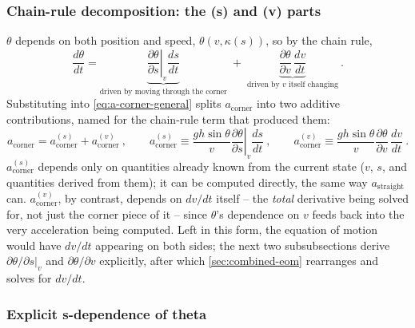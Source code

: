 \subsubsection{Chain-rule decomposition: the (s) and (v) parts}

$\theta$ depends on both position and speed, $\theta(v,\kappa(s))$, so by the
chain rule,
\begin{equation}
    \frac{d\theta}{dt} =
        \underbrace{\left.\frac{\partial\theta}{\partial s}\right|_v \frac{ds}{dt}}_{\text{driven by moving through the corner}}
        \;+\;
        \underbrace{\frac{\partial\theta}{\partial v}\,\frac{dv}{dt}}_{\text{driven by }v\text{ itself changing}}\ .
    \label{eq:dtheta-dt-chain-rule}
\end{equation}
Substituting into \cref{eq:a-corner-general} splits $a_{\mathrm{corner}}$ into
two additive contributions, named for the chain-rule term that produced them:
\begin{equation}
    a_{\mathrm{corner}} = a_{\mathrm{corner}}^{(s)} + a_{\mathrm{corner}}^{(v)}\ ,
    \qquad
    a_{\mathrm{corner}}^{(s)} \equiv
        \frac{gh\sin\theta}{v}\left.\frac{\partial\theta}{\partial s}\right|_v\frac{ds}{dt}\ ,
    \qquad
    a_{\mathrm{corner}}^{(v)} \equiv
        \frac{gh\sin\theta}{v}\frac{\partial\theta}{\partial v}\,\frac{dv}{dt}\ .
    \label{eq:a-corner-split}
\end{equation}
$a_{\mathrm{corner}}^{(s)}$ depends only on quantities already known from the
current state ($v$, $s$, and quantities derived from them); it can be computed
directly, the same way $a_{\mathrm{straight}}$ can. $a_{\mathrm{corner}}^{(v)}$,
by contrast, depends on $dv/dt$ itself -- the \emph{total} derivative being
solved for, not just the corner piece of it -- since $\theta$'s dependence on
$v$ feeds back into the very acceleration being computed. Left in this form,
the equation of motion would have $dv/dt$ appearing on both sides; the next
two subsubsections derive $\partial\theta/\partial s|_v$ and
$\partial\theta/\partial v$ explicitly, after which
\cref{sec:combined-eom} rearranges and solves for $dv/dt$.

\subsubsection{Explicit s-dependence of theta}


